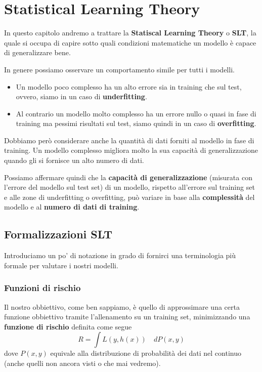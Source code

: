\chapter{Statistical Learning Theory}
In questo capitolo andremo a trattare la \textbf{Statiscal Learning Theory} o \textbf{SLT}, la quale si occupa di capire
sotto quali condizioni matematiche un modello \`e capace di generalizzare bene.

In genere possiamo osservare un comportamento simile per tutti i modelli.
\begin{itemize}
	\item Un modello poco complesso ha un alto errore sia in training che sul test, ovvero, siamo in un caso di
	      \textbf{underfitting}.
	\item Al contrario un modello molto complesso ha un errore nullo o quasi in fase di training ma pessimi risultati sul
	      test, siamo quindi in un caso di \textbf{overfitting}.
\end{itemize}
Dobbiamo per\`o considerare anche la quantit\`a di dati forniti al modello in fase di training. Un modello complesso
migliora molto la sua capacit\`a di generalizzazione quando gli si fornisce un alto numero di dati.

Possiamo affermare quindi che la \textbf{capacit\`a di generalizzazione} (misurata con l'errore del modello sul test set)
di un modello, rispetto all'errore sul training set e alle zone di underfitting o overfitting, pu\`o variare in base alla
\textbf{complessit\`a} del modello e al \textbf{numero di dati di training}.

\section{Formalizzazioni SLT}
Introduciamo un po' di notazione in grado di fornirci una terminologia pi\`u formale per valutare i nostri modelli.

\subsection{Funzioni di rischio}
Il nostro obbiettivo, come ben sappiamo, \`e quello di approssimare una certa funzione obbiettivo tramite l'allenamento
su un training set, minimizzando una \textbf{funzione di rischio} definita come segue
\[ R = \int L(y, h(x)) \quad d P(x, y) \]
dove $P(x, y)$ equivale alla distribuzione di probabilit\`a dei dati nel continuo (anche quelli non ancora visti o che mai
vedremo).

